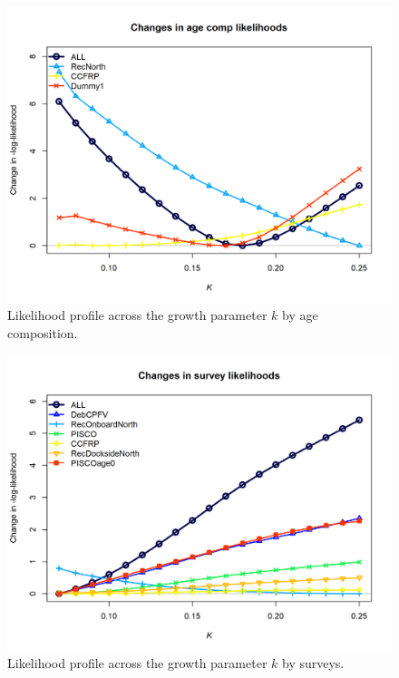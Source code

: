 \documentclass[12pt,]{article}
\begin{document}
\FloatBarrier 

\begin{figure}
\centering
\includegraphics{Figures/profile_k_piner.png}
\caption{Likelihood profile across the growth parameter \(k\) by age
composition. \label{fig:profile_k_piner}}
\end{figure}

\FloatBarrier 

\begin{figure}
\centering
\includegraphics{Figures/profile_k_piner2.png}
\caption{Likelihood profile across the growth parameter \(k\) by
surveys. \label{fig:profile_k_piner2}}
\end{figure}
\end{document}

